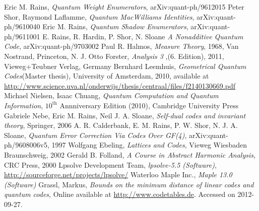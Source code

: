 \documentclass[12pt,a4paper,BCOR15mm,twoside,DIV12]{article}
\theoremstyle{definition}
\begin{document}
\clearpage \newpage
\begin{thebibliography}{9}
 Eric M. Rains, \emph{ Quantum Weight Enumerators}, arXiv:quant-ph/9612015
 Peter Shor, Raymond Laflamme, \emph{Quantum MacWilliams Identities}, arXiv:quant-ph/9610040
 Eric M. Rains, \emph{ Quantum Shadow Enumerators}, arXiv:quant-ph/9611001
 E. Rains, R. Hardin, P. Shor, N. Sloane \emph{A Nonadditive Quantum Code}, arXiv:quant-ph/9703002
 Paul R. Halmos, \emph{Measure Theory}, 1968, Van Nostrand, Princeton, N. J.
 Otto Forster, \emph{Analysis 3 },(6. Edition), 2011, Vieweg+Teubner Verlag, Germany
 Bernhard Leemhuis, \emph{Geometrical Quantum Codes}(Master thesis), University of Amsterdam, 2010, available at \url{ http://www.science.uva.nl/onderwijs/thesis/centraal/files/f2140130669.pdf }
  Michael Nielsen, Isaac Chuang, \emph{ Quantum Computation and Quantum Information}, $10^\text{th}$ Annniversary Edition (2010), Cambridge University Press
 Gabriele Nebe, Eric M. Rains, Neil J. A. Sloane, \emph{Self-dual codes and invariant theory}, Springer, 2006
 A. R. Calderbank, E. M. Rains, P. W. Shor, N. J. A. Sloane, \emph{Quantum Error Correction Via Codes Over GF(4)}, arXiv:quant-ph/9608006v5, 1997
 Wolfgang Ebeling, \emph{ Lattices and Codes}, Vieweg Wiesbaden Braunschweig, 2002
 Gerald B. Folland, \emph{ A Course in Abstract Harmonic Analysis}, CRC Press, 2000
 Lpsolve Development Team, \emph{lpsolve-5.5 (Software)}, \url{http://sourceforge.net/projects/lpsolve/}
 Waterloo Maple Inc., \emph{Maple 13.0 (Software)}
  Grassl, Markus, \emph{Bounds on the minimum distance of linear codes and quantum codes}, Online available at \url{http://www.codetables.de}. Accessed on 2012-09-27.
\end{thebibliography}
\end{document}
